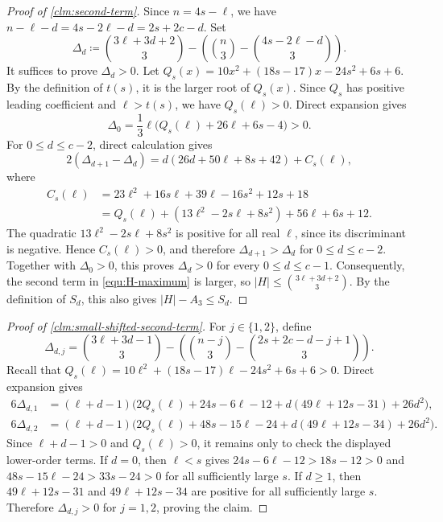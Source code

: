 \documentclass[10pt,a4paper]{article}
\numberwithin{equation}{section}
\theoremstyle{definition}
\begin{document}
\begin{proof}[Proof of \cref{clm:second-term}]
        Since $n=4s-\ell$, we have $n-\ell-d=4s-2\ell-d=2s+2c-d$.
        Set
        \[
                \Delta_d
                \coloneqq
                \binom{3\ell+3d+2}{3}
                -\left(\binom n3-\binom{4s-2\ell-d}{3}\right).
        \]
        It suffices to prove $\Delta_d>0$.
        Let $Q_s(x)=10x^2+(18s-17)x-24s^2+6s+6$.
        By the definition of $t(s)$, it is the larger root of $Q_s(x)$.
        Since $Q_s$ has positive leading coefficient and $\ell>t(s)$, we have $Q_s(\ell)>0$.
        Direct expansion gives
        \[
                \Delta_0=\frac{1}{3}\ell\bigl(Q_s(\ell)+26\ell+6s-4\bigr)>0.
        \]
        For $0\le d\le c-2$, direct calculation gives
        \[
                2(\Delta_{d+1}-\Delta_d)
                =d(26d+50\ell+8s+42)+C_s(\ell),
        \]
        where
        \[
                \begin{aligned}
                        C_s(\ell)
                         & =23\ell^2+16s\ell+39\ell-16s^2+12s+18           \\
                         & =Q_s(\ell)+(13\ell^2-2s\ell+8s^2)+56\ell+6s+12.
                \end{aligned}
        \]
        The quadratic $13\ell^2-2s\ell+8s^2$ is positive for all real $\ell$, since its discriminant is negative.
        Hence $C_s(\ell)>0$, and therefore $\Delta_{d+1}>\Delta_d$ for $0\le d\le c-2$.
        Together with $\Delta_0>0$, this proves $\Delta_d>0$ for every $0\le d\le c-1$.
        Consequently, the second term in \eqref{equ:H-maximum} is larger, so $|H|\le \binom{3\ell+3d+2}{3}$.
        By the definition of $S_d$, this also gives $|H|-A_3\le S_d$.
\end{proof}

\begin{proof}[Proof of \cref{clm:small-shifted-second-term}]
        For $j\in\{1,2\}$, define
        \[
                \Delta_{d,j}
                =
                \binom{3\ell+3d-1}{3}
                -\left(
                \binom{n-j}{3}-\binom{2s+2c-d-j+1}{3}
                \right).
        \]
        Recall that $Q_s(\ell)=10\ell^2+(18s-17)\ell-24s^2+6s+6>0$.
        Direct expansion gives
        \[
                \begin{aligned}
                        6\Delta_{d,1}
                         & =(\ell+d-1)\bigl(2Q_s(\ell)+24s-6\ell-12
                        +d(49\ell+12s-31)+26d^2\bigr),               \\
                        6\Delta_{d,2}
                         & =(\ell+d-1)\bigl(2Q_s(\ell)+48s-15\ell-24
                        +d(49\ell+12s-34)+26d^2\bigr).
                \end{aligned}
        \]
        Since $\ell+d-1>0$ and $Q_s(\ell)>0$, it remains only to check the displayed lower-order terms.
        If $d=0$, then $\ell<s$ gives $24s-6\ell-12>18s-12>0$ and $48s-15\ell-24>33s-24>0$ for all sufficiently large $s$.
        If $d\ge1$, then $49\ell+12s-31$ and $49\ell+12s-34$ are positive for all sufficiently large $s$.
        Therefore $\Delta_{d,j}>0$ for $j=1,2$, proving the claim.
\end{proof}
\end{document}
